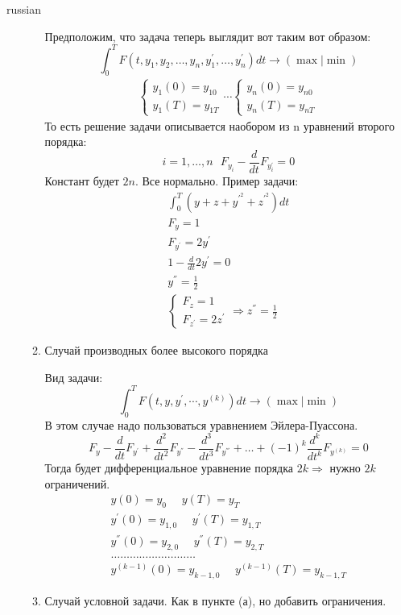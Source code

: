 \documentclass{article}
\begin{document}
\begin{otherlanguage*}{russian}
\begin{enumerate}
\begin{enumerate}
Предположим, что задача теперь выглядит вот таким вот образом: 
\begin{equation}
\int_0^T F(t, y_1, y_2, \ldots, y_n, y^{'}_1, \ldots, y^{'}_n) dt \rightarrow (\max | \min) 
\end{equation}
\begin{align}
\begin{cases}
y_1(0) = y_{10} \\
y_1(T) = y_{1T} 
\end{cases} 
\cdots
\begin{cases}
y_n(0) = y_{n0} \\
y_n (T) = y_{nT} 
\end{cases}
\end{align}
То есть решение задачи описывается наобором из n уравнений второго порядка: 
\begin{equation}
i = 1, \ldots, n \,\,\,\, F_{y_i} - \frac{d}{dt} F_{y^{'}_i} = 0 
\end{equation}
Констант будет $ 2 n$. Все нормально. 
Пример задачи: 
\begin{align}
\int_0^T (y + z + y^{'^{2}} + z^{'^{2}}) dt  \\
F_y = 1 \\ 
F_{y^{'}} = 2y^{'} \\ 
1 - \frac{d}{dt} 2y^{'} = 0 \\ 
y^{''} = \frac{1}{2} \\
\begin{cases}
F_z = 1 \\ 
F_{z^{'}} = 2 z^{'} 
\end{cases} \Rightarrow z^{''} = \frac{1}{2}
\end{align}
\item Случай производных более высокого порядка 

Вид задачи:
\begin{equation}
\int_0^T F(t, y, y^{'}, \cdots, y^{(k)}) dt \rightarrow (\max | \min) 
\end{equation}
В этом случае надо пользоваться уравнением Эйлера-Пуассона. 
\begin{equation}
F_y - \frac{d}{dt} F_{y^{'}} + \frac{d^2}{dt^2} F_{y^{''}} - \frac{d^3}{dt^3} F_{y^{'''}} + \ldots + (-1)^k \frac{d^k}{dt^k} F_{y^{(k)}} = 0 
\end{equation}	
Тогда будет дифференциальное уравнение порядка $ 2k \Rightarrow $ нужно $ 2k $ ограничений. 
\begin{align}
y(0) = y_0 \,\,\,\,\,\,\,\,
y(T) = y_T \\ 
y^{'}(0) = y_{1, 0} \,\,\,\,\,\,\,\,
y^{'}(T) = y_{1, T} \\ 
y^{''}(0) = y_{2, 0} \,\,\,\,\,\,\,\,
y^{''}(T) = y_{2, T} \\ 
\ldots \ldots \ldots \ldots \ldots \ldots\ldots \ldots \ldots \\ 
y^{(k-1)} (0) = y_{k-1, 0} \,\,\,\,\,\,\,\, y^{(k-1)} (T) = y_{k-1, T} 
\end{align} 
\item Случай условной задачи. Как в пункте (а), но добавить ограничения. 


\end{enumerate}
\end{enumerate}
\end{otherlanguage*}
\end{document}
